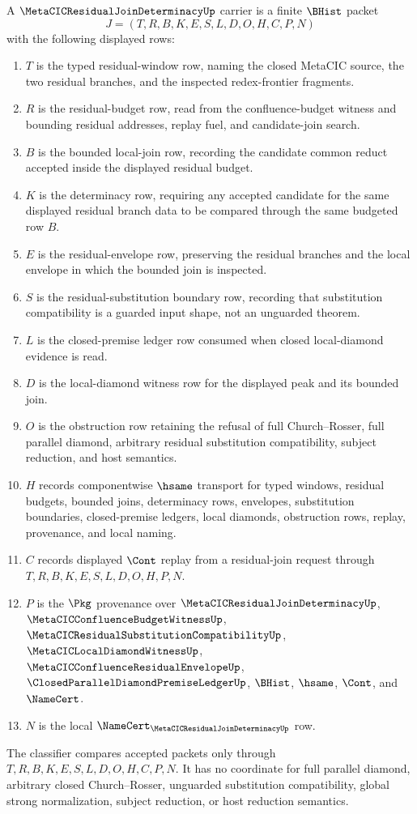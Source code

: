\begin{definition}
\label{def:metacic-residual-join-determinacy-carrier}
A $\MetaCICResidualJoinDeterminacyUp$ carrier is a finite $\BHist$ packet
$$
J=(T,R,B,K,E,S,L,D,O,H,C,P,N)
$$
with the following displayed rows:
\begin{enumerate}
\item $T$ is the typed residual-window row, naming the closed MetaCIC source, the two residual branches, and the inspected redex-frontier fragments.
\item $R$ is the residual-budget row, read from the confluence-budget witness and bounding residual addresses, replay fuel, and candidate-join search.
\item $B$ is the bounded local-join row, recording the candidate common reduct accepted inside the displayed residual budget.
\item $K$ is the determinacy row, requiring any accepted candidate for the same displayed residual branch data to be compared through the same budgeted row $B$.
\item $E$ is the residual-envelope row, preserving the residual branches and the local envelope in which the bounded join is inspected.
\item $S$ is the residual-substitution boundary row, recording that substitution compatibility is a guarded input shape, not an unguarded theorem.
\item $L$ is the closed-premise ledger row consumed when closed local-diamond evidence is read.
\item $D$ is the local-diamond witness row for the displayed peak and its bounded join.
\item $O$ is the obstruction row retaining the refusal of full Church--Rosser, full parallel diamond, arbitrary residual substitution compatibility, subject reduction, and host semantics.
\item $H$ records componentwise $\hsame$ transport for typed windows, residual budgets, bounded joins, determinacy rows, envelopes, substitution boundaries, closed-premise ledgers, local diamonds, obstruction rows, replay, provenance, and local naming.
\item $C$ records displayed $\Cont$ replay from a residual-join request through $T,R,B,K,E,S,L,D,O,H,P,N$.
\item $P$ is the $\Pkg$ provenance over $\MetaCICResidualJoinDeterminacyUp$, $\MetaCICConfluenceBudgetWitnessUp$, $\MetaCICResidualSubstitutionCompatibilityUp$, $\MetaCICLocalDiamondWitnessUp$, $\MetaCICConfluenceResidualEnvelopeUp$, $\ClosedParallelDiamondPremiseLedgerUp$, $\BHist$, $\hsame$, $\Cont$, and $\NameCert$.
\item $N$ is the local $\NameCert_{\MetaCICResidualJoinDeterminacyUp}$ row.
\end{enumerate}
The classifier compares accepted packets only through $T,R,B,K,E,S,L,D,O,H,C,P,N$. It has no coordinate for full parallel diamond, arbitrary closed Church--Rosser, unguarded substitution compatibility, global strong normalization, subject reduction, or host reduction semantics.
\end{definition}

